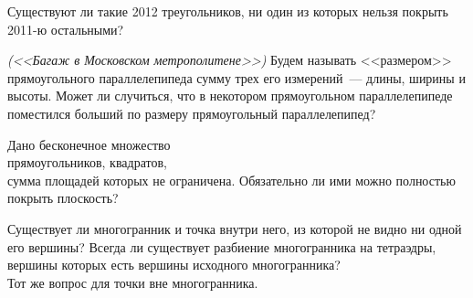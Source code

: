 \begin{problems}
\item
Существуют ли такие 2012 треугольников, ни один из которых нельзя покрыть
2011-ю остальными?


\item\emph{(<<Багаж в Московском метрополитене>>)}
Будем называть <<размером>> прямоугольного параллелепипеда сумму трех его
измерений~--- длины, ширины и высоты.
Может ли случиться, что в некотором прямоугольном параллелепипеде поместился
больший по размеру прямоугольный параллелепипед?

\item
Дано бесконечное множество
\\
\sp прямоугольников,
\quad
\sp квадратов,
\\
сумма площадей которых не ограничена.
Обязательно ли ими можно полностью покрыть плоскость?

\item
\sp
Существует ли многогранник и точка внутри него, из которой не видно ни одной
его вершины?
Всегда ли существует разбиение многогранника на тетраэдры, вершины которых есть
вершины исходного многогранника?
\\
\sp
Тот же вопрос для точки вне многогранника.

\end{problems}

